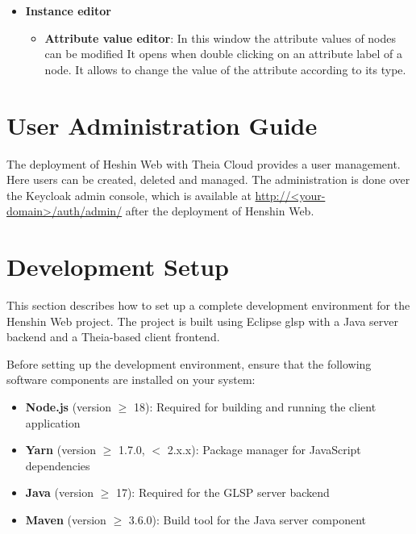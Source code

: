 \begin{itemize}
\begin{itemize}
    \end{itemize}
    \item \textbf{Instance editor}
    \begin{itemize}
        \item \textbf{Attribute value editor}: In this window the attribute values of nodes can be modified It opens when double clicking on an attribute label of a node. It allows to change the value of the attribute according to its type.
    \end{itemize}
\end{itemize}

\section{User Administration Guide}
\label{sec:admin-guide}

The deployment of Heshin Web with Theia Cloud provides a user management. Here users can be created, deleted and managed. The administration is done over the Keycloak admin console, which is available at \url{http://<your-domain>/auth/admin/} after the deployment of Henshin Web. 



\section{Development Setup}
\label{sec:dev-setup}

This section describes how to set up a complete development environment for the Henshin Web project. The project is built using Eclipse \ac{glsp} with a Java server backend and a Theia-based client frontend.

Before setting up the development environment, ensure that the following software components are installed on your system:

\begin{itemize}
    \item \textbf{Node.js} (version $\geq$ 18): Required for building and running the client application
    \item \textbf{Yarn} (version $\geq$ 1.7.0, $<$ 2.x.x): Package manager for JavaScript dependencies
    \item \textbf{Java} (version $\geq$ 17): Required for the GLSP server backend
    \item \textbf{Maven} (version $\geq$ 3.6.0): Build tool for the Java server component
\end{itemize}

